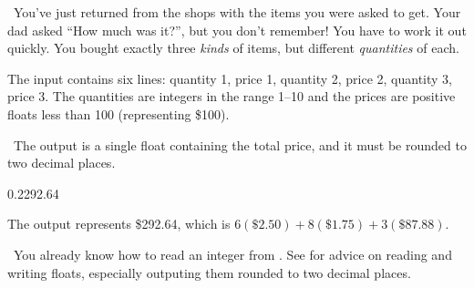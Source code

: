 
\Question\ You've just returned from the shops with the items you were asked to get. Your
dad asked ``How much was it?'', but you don't remember! You have to work it out quickly.
You bought exactly three \emph{kinds} of items, but different \emph{quantities} of each.

\Input

The input contains six lines: quantity 1, price 1, quantity 2, price 2, quantity 3, price
3. The quantities are integers in the range 1--10 and the prices are positive floats less
than 100 (representing \$100).

\Output\ The output is a single float containing the total price, and it must be rounded
to two decimal places.

\Sample

       {0.2}{292.64}

\Explanation The output represents \$292.64, which is $6(\$2.50) + 8(\$1.75) + 3(\$87.88)$.

\Scratch\ You already know how to read an integer from \IN. See  for advice on reading and writing floats, especially outputing them rounded to two
decimal places.

